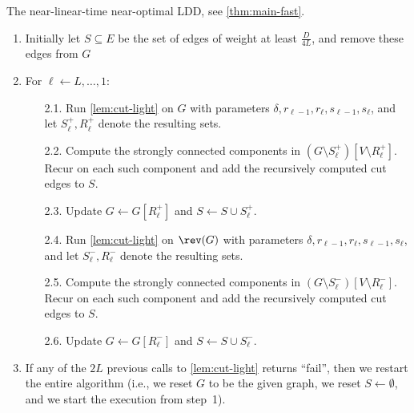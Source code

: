 \begin{algorithm}[t]
\caption{The near-linear-time near-optimal LDD, see \cref{thm:main-fast}.} \label{alg:ldd-fast}
\begin{enumerate}
    \item Initially let $S \subseteq E$ be the set of edges of weight at least $\frac{D}{4L}$, and remove these edges from $G$
    \item For $\ell \gets L, \dots, 1$:
    \begin{enumerate}
        \item[2.1.] Run \cref{lem:cut-light} on $G$ with parameters $\delta, r_{\ell-1}, r_\ell, s_{\ell-1}, s_{\ell}$, and let $S^+_\ell, R^+_\ell$ denote the resulting sets.
        \item[2.2.] Compute the strongly connected components in $(G \setminus S^+_\ell)[V \setminus R^+_\ell]$. Recur on each such component and add the recursively computed cut edges to $S$.
        \item[2.3.] Update $G \gets G[R^+_\ell]$ and $S \gets S \cup S^+_\ell$.
        \item[2.4.] Run \cref{lem:cut-light} on $\rev(G)$ with parameters $\delta, r_{\ell-1}, r_\ell, s_{\ell-1}, s_{\ell}$, and let $S^-_\ell, R^-_\ell$ denote the resulting sets.
        \item[2.5.] Compute the strongly connected components in $(G \setminus S^-_\ell)[V \setminus R^-_\ell]$. Recur on each such component and add the recursively computed cut edges to $S$.
        \item[2.6.] Update $G \gets G[R^-_\ell]$ and $S \gets S \cup S^-_\ell$.
    \end{enumerate}
    \item If any of the $2L$ previous calls to \cref{lem:cut-light} returns ``fail'', then we restart the entire algorithm (i.e., we reset $G$ to be the given graph, we reset $S \gets \emptyset$, and we start the execution from step~1).
\end{enumerate}
\end{algorithm}

